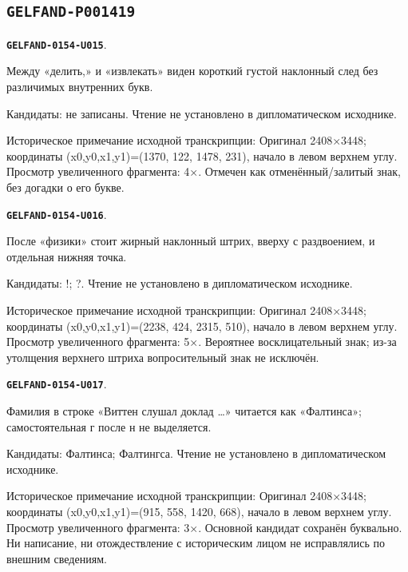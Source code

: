 \documentclass[11pt]{article}
\theoremstyle{definition}
\theoremstyle{remark}
\begin{document}
\subsection*{\texttt{GELFAND-P001419}}
\par\noindent\leavevmode{}\label{GELFAND-0154-U015}\label{GELFAND-P001419:nb-cancelled-letter:note}\textbf{\texttt{GELFAND-0154-U015}}.\nopagebreak[4]\par
Между «делить,» и «извлекать» виден короткий густой наклонный след без различимых внутренних букв.\par
Кандидаты: не записаны. Чтение не установлено в дипломатическом исходнике.\par
Историческое примечание исходной транскрипции: Оригинал 2408×3448; координаты (x0,y0,x1,y1)=(1370, 122, 1478, 231), начало в левом верхнем углу. Просмотр увеличенного фрагмента: 4×. Отмечен как отменённый/залитый знак, без догадки о его букве.\par\medskip
\par\noindent\leavevmode{}\label{GELFAND-0154-U016}\label{GELFAND-P001419:heading-last-sign:note}\textbf{\texttt{GELFAND-0154-U016}}.\nopagebreak[4]\par
После «физики» стоит жирный наклонный штрих, вверху с раздвоением, и отдельная нижняя точка.\par
Кандидаты: !; ?. Чтение не установлено в дипломатическом исходнике.\par
Историческое примечание исходной транскрипции: Оригинал 2408×3448; координаты (x0,y0,x1,y1)=(2238, 424, 2315, 510), начало в левом верхнем углу. Просмотр увеличенного фрагмента: 5×. Вероятнее восклицательный знак; из-за утолщения верхнего штриха вопросительный знак не исключён.\par\medskip
\par\noindent\leavevmode{}\label{GELFAND-0154-U017}\label{GELFAND-P001419:faltings-name:note}\textbf{\texttt{GELFAND-0154-U017}}.\nopagebreak[4]\par
Фамилия в строке «Виттен слушал доклад …» читается как «Фалтинса»; самостоятельная г после н не выделяется.\par
Кандидаты: Фалтинса; Фалтингса. Чтение не установлено в дипломатическом исходнике.\par
Историческое примечание исходной транскрипции: Оригинал 2408×3448; координаты (x0,y0,x1,y1)=(915, 558, 1420, 668), начало в левом верхнем углу. Просмотр увеличенного фрагмента: 3×. Основной кандидат сохранён буквально. Ни написание, ни отождествление с историческим лицом не исправлялись по внешним сведениям.\par\medskip
\end{document}
